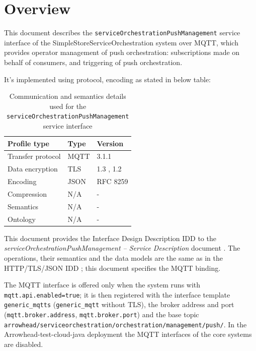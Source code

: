 \documentclass[a4paper]{arrowhead}
\begin{document}
\section{Overview}
\label{sec:overview}

This document describes the \texttt{service\allowbreak{}Orchestration\allowbreak{}Push\allowbreak{}Management} service interface of the SimpleStoreServiceOrchestration system over MQTT, which provides operator management of push orchestration: subscriptions made on behalf of consumers, and triggering of push orchestration.

It's implemented using protocol, encoding as stated in below table:
\begin{table}[ht!]
  \centering
  \begin{tabular}{|l|l|l|}
    \hline
    \rowcolor{gray!33} Profile type & Type & Version \\ \hline
    Transfer protocol & MQTT & 3.1.1 \cite{mqtt311} \\ \hline
    Data encryption & TLS & 1.3 \cite{rfc8446}, 1.2 \cite{rfc5246} \\ \hline
    Encoding & JSON & RFC 8259 \cite{rfc8259} \\ \hline
    Compression & N/A & - \\ \hline
    Semantics & N/A & - \\ \hline
    Ontology & N/A & - \\ \hline
  \end{tabular}
  \caption{Communication and semantics details used for the \texttt{service\allowbreak{}Orchestration\allowbreak{}Push\allowbreak{}Management} service interface}
  \label{tab:comunication_semantics_profile}
\end{table}

This document provides the Interface Design Description IDD to the \textit{serviceOrchestrationPushManagement -- Service Description} document \cite{ssso-serviceOrchestrationPushManagement-sd}.
The operations, their semantics and the data models are the same as in the HTTP/TLS/JSON IDD \cite{ssso-serviceOrchestrationPushManagement-http-idd}; this document specifies the MQTT binding.

The MQTT interface is offered only when the system runs with \texttt{mqtt.api.enabled=true}; it is then registered with the interface template \texttt{generic\_\allowbreak{}mqtts} (\texttt{generic\_\allowbreak{}mqtt} without TLS), the broker address and port (\texttt{mqtt.\allowbreak{}broker.\allowbreak{}address}, \texttt{mqtt.\allowbreak{}broker.\allowbreak{}port}) and the base topic \texttt{arrowhead/\allowbreak{}serviceorchestration/\allowbreak{}orchestration/\allowbreak{}management/\allowbreak{}push/\allowbreak{}}. In the Arrowhead-test-cloud-java deployment the MQTT interfaces of the core systems are disabled.
\end{document}
